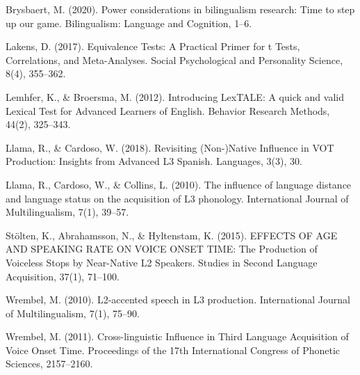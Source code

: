 \documentclass[
  12pt,
]{article}
\begin{document}
\begin{tiny}
Brysbaert, M. (2020). Power considerations in bilingualism research: Time to step up our game. Bilingualism: Language and Cognition, 1–6. 

Lakens, D. (2017). Equivalence Tests: A Practical Primer for t Tests, Correlations, and Meta-Analyses. Social Psychological and Personality Science, 8(4), 355–362. 

Lemhfer, K., \& Broersma, M. (2012). Introducing LexTALE: A quick and valid Lexical Test for Advanced Learners of English. Behavior Research Methods, 44(2), 325–343. 

Llama, R., \& Cardoso, W. (2018). Revisiting (Non-)Native Influence in VOT Production: Insights from Advanced L3 Spanish. Languages, 3(3), 30. 

Llama, R., Cardoso, W., \& Collins, L. (2010). The influence of language distance and language status on the acquisition of L3 phonology. International Journal of Multilingualism, 7(1), 39–57. 

St\"{o}lten, K., Abrahamsson, N., \& Hyltenstam, K. (2015). EFFECTS OF AGE AND SPEAKING RATE ON VOICE ONSET TIME: The Production of Voiceless Stops by Near-Native L2 Speakers. Studies in Second Language Acquisition, 37(1), 71–100.

Wrembel, M. (2010). L2-accented speech in L3 production. International Journal of Multilingualism, 7(1), 75–90. 

Wrembel, M. (2011). Cross-linguistic Influence in Third Language Acquisition of Voice Onset Time. Proceedings of the 17th International Congress of Phonetic Sciences, 2157–2160.
\end{tiny}

\endgroup
\end{document}
